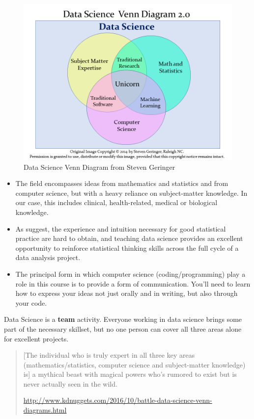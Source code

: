 \documentclass[
]{book}
\providecommand{\tightlist}{%
  \setlength{\itemsep}{0pt}\setlength{\parskip}{0pt}}
\begin{document}
\begin{figure}
\includegraphics[width=0.8\linewidth]{figures/data-science-venn20} \caption{Data Science Venn Diagram from Steven Geringer}\label{fig:datasci-fig}
\end{figure}

\begin{itemize}
\tightlist
\item
  The field encompasses ideas from mathematics and statistics and from computer science, but with a heavy reliance on subject-matter knowledge. In our case, this includes clinical, health-related, medical or biological knowledge.
\item
  As \citet{Gelman-Nolan} suggest, the experience and intuition necessary for good statistical practice are hard to obtain, and teaching data science provides an excellent opportunity to reinforce statistical thinking skills across the full cycle of a data analysis project.
\item
  The principal form in which computer science (coding/programming) play a role in this course is to provide a form of communication. You'll need to learn how to express your ideas not just orally and in writing, but also through your code.
\end{itemize}

Data Science is a \textbf{team} activity. Everyone working in data science brings some part of the necessary skillset, but no one person can cover all three areas alone for excellent projects.

\begin{quote}
{[}The individual who is truly expert in all three key areas (mathematics/statistics, computer science and subject-matter knowledge) is{]} a mythical beast with magical powers who's rumored to exist but is never actually seen in the wild.

\url{http://www.kdnuggets.com/2016/10/battle-data-science-venn-diagrams.html}
\end{quote}
\end{document}
